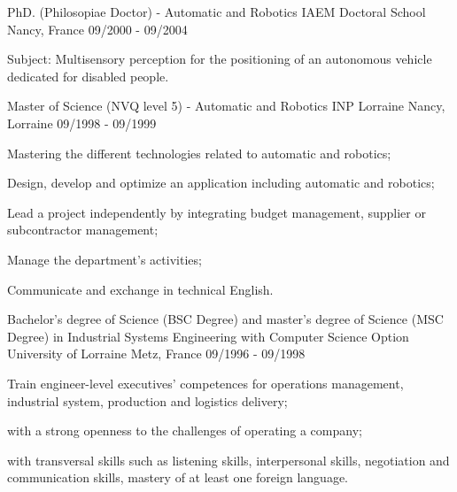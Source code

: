
\begin{cventries}

  \cventry
    {PhD. (Philosopiae Doctor) - Automatic and Robotics} %
    {IAEM Doctoral School} %
    {Nancy, France} %
    {09/2000 - 09/2004} %
    {
      \begin{cvitems} %
        \item {Subject: Multisensory perception for the positioning of an autonomous vehicle dedicated for disabled people.}
      \end{cvitems}
    }
  
  \cventry
    {Master of Science (NVQ level 5) - Automatic and Robotics}
    {INP Lorraine} %
    {Nancy, Lorraine} %
    {09/1998 - 09/1999} %
    {
      \begin{cvitems} %
        \item {Mastering the different technologies related to automatic and robotics;}
        \item {Design, develop and optimize an application including automatic and robotics;}
        \item {Lead a project independently by integrating budget management, supplier or subcontractor management;}
        \item {Manage the department's activities;}
        \item {Communicate and exchange in technical English.}
      \end{cvitems}
    }

  \cventry
    {Bachelor's degree of Science (BSC Degree) and master's degree of Science (MSC Degree) in Industrial Systems Engineering with Computer Science Option} %
    {University of Lorraine} %
    {Metz, France} %
    {09/1996 - 09/1998} %
    {
      \begin{cvitems} %
        \item {Train engineer-level executives' competences for operations management, industrial system, production and logistics delivery;}
        \item {with a strong openness to the challenges of operating a company;} 
        \item {with transversal skills such as listening skills, interpersonal skills, negotiation and communication skills, mastery of at least one foreign language.}
      \end{cvitems}
    }


\end{cventries}

